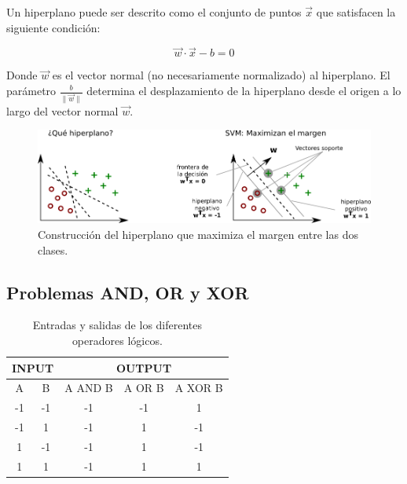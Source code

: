 \documentclass[12pt,spanish,a4paper]{article}
\numberwithin{equation}{section}
\begin{document}
Un hiperplano puede ser descrito como el conjunto de puntos
\({\displaystyle {\vec {x}}}\) que satisfacen la siguiente condición:

\begin{equation}
{\displaystyle {\vec {w}}\cdot {\vec {x}} - b = 0}
\end{equation}

Donde \({\displaystyle {\vec {w}}}\) es el vector normal (no
necesariamente normalizado) al hiperplano. El parámetro
\({\displaystyle {\tfrac {b}{\|{\vec {w}}\|}}}\) determina el
desplazamiento de la hiperplano desde el origen a lo largo del vector
normal \({\displaystyle {\vec {w}}}\).

\begin{figure}[h]
\begin{center}
\includegraphics[width=0.90\linewidth]{./figures/maximizar_margen.png}
\caption{Construcción del hiperplano que maximiza el margen entre las dos clases.}
\label{fig:maximizar_margen}
\end{center}
\end{figure}

\clearpage

\hypertarget{problemas-and-or-y-xor}{%
\subsection{Problemas AND, OR y XOR}\label{problemas-and-or-y-xor}}

\begin{table}[]
\centering
\begin{tabular}{ccccc}
\hline\hline
\multicolumn{2}{c|}{INPUT} & \multicolumn{3}{c}{OUTPUT} \\
\hline\hline
A           & B           & A AND B & A OR B & A XOR B \\
\hline
-1          & -1          & -1      & -1     & 1       \\
-1          & 1           & -1      & 1      & -1      \\
1           & -1          & -1      & 1      & -1      \\
1           & 1           & -1      & 1      & 1       \\
\hline\hline
\end{tabular}
\caption{Entradas y salidas de los diferentes operadores lógicos.}
\label{tab:andorxor}
\end{table}
\end{document}
